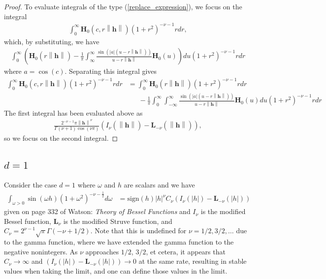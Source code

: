 \documentclass[11pt]{article}
\newcommand{\rh}{r\left\lVert \boldsymbol{h}\right\rVert}
\begin{document}
\begin{proof}


To evaluate integrals of the type (\ref{replace_expression}), we focus on the integral \begin{align*}
 \int_0^\infty \boldsymbol{H}_{0}(c, r\left\lVert \boldsymbol{h}\right\rVert) (1+r^2)^{-\nu-1} r dr,
\end{align*}which, by substituting, we have \begin{align*}
\int_0^\infty 
\left(\boldsymbol{H}_0(\rh) - \frac{1}{\pi} \int_{\infty}^\infty \frac{\sin(|a|(u-\rh))}{u-\rh}\boldsymbol{H}_0(u) \right) du (1+r^2)^{-\nu-1} r dr
\end{align*}where $a = \cos(c)$. Separating this integral gives \begin{align*}
 \int_0^\infty \boldsymbol{H}_{0}(c, r\left\lVert \boldsymbol{h}\right\rVert) (1+r^2)^{-\nu-1} r dr &= \int_0^\infty\boldsymbol{H}_0(\rh)(1+r^2)^{-\nu - 1}rdr\\ & \ \ \ \ \ \ \ - \frac{1}{\pi}\int_0^\infty\int_{-\infty}^\infty \frac{\sin(|a|(u-\rh))}{u-\rh}\boldsymbol{H}_0(u) du(1+ r^2)^{-\nu-1}rdr
\end{align*}
The first integral has been evaluated above as \begin{align*}
\frac{2^{-\nu -1} \pi \left\lVert \boldsymbol{h}\right\rVert^{\nu}}{\Gamma(\nu+1) \cos(\nu \pi)} \left( I_{\nu }(\left\lVert \boldsymbol{h}\right\rVert) - \boldsymbol{L}_{-\nu} (\left\lVert \boldsymbol{h}\right\rVert)\right),
\end{align*}so we focus on the second integral. 
\end{proof}




\subsection{$d=1$}
 Consider the case $d=1$ where $\omega$ and $h$ are scalars and we have 
  \begin{align*}
\int_{\omega > 0}\sin(\omega h)(1 + \omega^2)^{-\nu- \frac{1}{2}} d\omega
&= \textrm{sign}(h) |h|^{\nu} C_\nu\left(I_{\nu}(|h|) - \boldsymbol{L}_{-\nu} (|h|)\right)
 \end{align*}given on page 332 of Watson: \textit{Theory of Bessel Functions} and $I_\nu$ is the modified Bessel function, $\boldsymbol{L}_\nu$ is the modified Struve function, and $C_\nu = 2^{\nu-1} \sqrt{\pi} \Gamma(-\nu + 1/2)$. Note that this is undefined for $\nu = 1/2, 3/2, \dots$ due to the gamma function, where we have extended the gamma function to the negative nonintegers. As $\nu$ approaches $1/2$, $3/2$, et cetera, it appears that $C_\nu \to \infty$ and $\left(I_{\nu}(|h|) - \boldsymbol{L}_{-\nu} (|h|)\right) \to 0$ at the same rate, resulting in stable values when taking the limit, and one can define those values in the limit.
 
\end{document}
